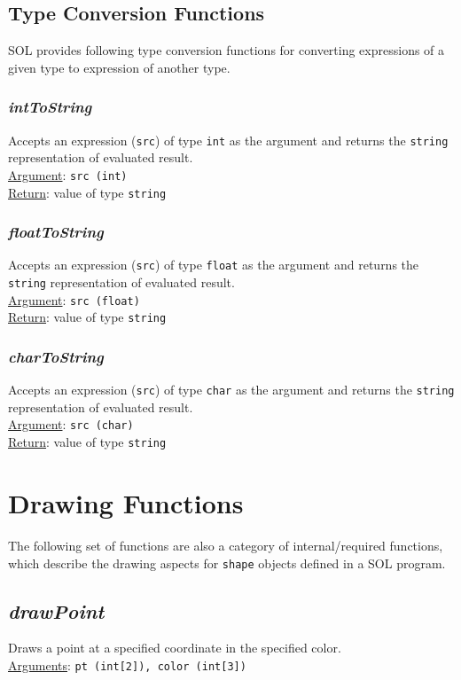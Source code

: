     \subsection{Type Conversion Functions}
    SOL provides following type conversion functions for converting expressions of a given type to expression of another type.

    \subsubsection{\textit{intToString}}
    Accepts an expression (\texttt{src}) of type \texttt{int} as the argument and returns the \texttt{string} representation of evaluated result.\\
    \underline{Argument}: \texttt{src (int)}\\
    \underline{Return}: value of type \texttt{string}

    \subsubsection{\textit{floatToString}}
    Accepts an expression (\texttt{src}) of type \texttt{float} as the argument and returns the \texttt{string} representation of evaluated result.\\
    \underline{Argument}: \texttt{src (float)}\\
    \underline{Return}: value of type \texttt{string}

    \subsubsection{\textit{charToString}}
    Accepts an expression (\texttt{src}) of type \texttt{char} as the argument and returns the \texttt{string} representation of evaluated result.\\
    \underline{Argument}: \texttt{src (char)}\\
    \underline{Return}: value of type \texttt{string}

\section{Drawing Functions}
The following set of functions are also a category of internal/required functions, which describe the drawing aspects for \texttt{shape} objects defined in a SOL program.

    \subsection{\textit{drawPoint}}
    Draws a point at a specified coordinate in the specified color.\\
    \underline{Arguments}: \texttt{pt (int[2]), color (int[3])}

